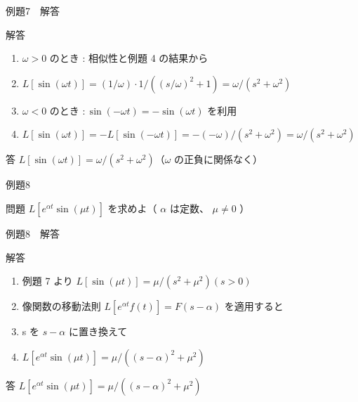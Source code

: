 \documentclass[aspectratio=43,professionalfonts,handout]{beamer}
\begin{document}
\begin{frame}{例題7　解答}
  \begin{exampleblock}{解答}
  \begin{enumerate}[1.]
    \item[] $\omega > 0$ のとき : 相似性と例題 4 の結果から
    \item[] $L[\sin(\omega t)] = (1/\omega) \cdot 1/((s/\omega)^{2}+1) = \omega/(s^{2}+\omega^{2})$
    \item[] $\omega < 0$ のとき $: \sin(-\omega t) = -\sin(\omega t)$ を利用
    \item[] $L[\sin(\omega t)] = -L[\sin(-\omega t)] = -(-\omega)/(s^{2}+\omega^{2}) = \omega/(s^{2}+\omega^{2})$
  \end{enumerate}
  \end{exampleblock}
  \begin{alertblock}{答}
    $L[\sin(\omega t)] = \omega/(s^{2}+\omega^{2})$（$\omega$ の正負に関係なく）
  \end{alertblock}
\end{frame}

\begin{frame}{例題8}
  \begin{exampleblock}{問題}
    $L[e^{\alpha t}\sin(\mu t)]$ を求めよ（ $\alpha$ は定数、 $\mu \neq 0$ ）\\[2pt]
  \end{exampleblock}
\end{frame}

\begin{frame}{例題8　解答}
  \begin{exampleblock}{解答}
  \begin{enumerate}[1.]
    \item[] 例題 7 より $L[\sin(\mu t)] = \mu/(s^{2}+\mu^{2}) (s > 0)$
    \item[] 像関数の移動法則 $L[e^{\alpha t}f(t)] = F(s-\alpha)$ を適用すると
    \item[] s を $s-\alpha$ に置き換えて
    \item[] $L[e^{\alpha t}\sin(\mu t)] = \mu/((s-\alpha)^{2}+\mu^{2})$
  \end{enumerate}
  \end{exampleblock}
  \begin{alertblock}{答}
    $L[e^{\alpha t}\sin(\mu t)] = \mu/((s-\alpha)^{2}+\mu^{2})$
  \end{alertblock}
\end{frame}
\end{document}
